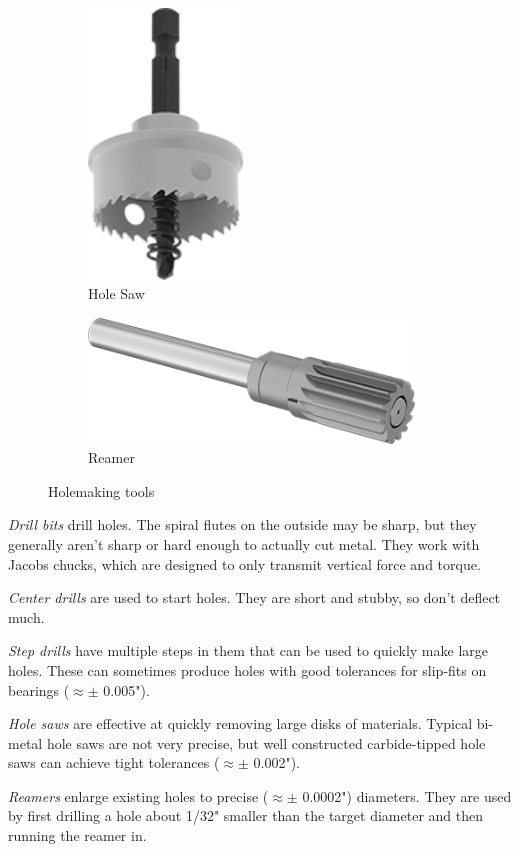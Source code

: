 \begin{figure}[H]
\begin{subfigure}[b]{.19\linewidth}
		\includegraphics[width=0.45\textwidth,angle=73]{imgs/hole_saw.png}
		\caption{Hole Saw}
	\end{subfigure}\begin{subfigure}[b]{.19\linewidth}
		\includegraphics[width=0.95\textwidth]{imgs/reamer.png}
		\caption{Reamer}
	\end{subfigure}
	\caption{Holemaking tools}
\end{figure}

 \begin{asparaenum}[a)]
 	\item \textit{Drill bits} drill holes. The spiral flutes on the outside may be sharp, but they generally aren't sharp or hard enough to actually cut metal. They work with Jacobs chucks, which are designed to only transmit vertical force and torque.
 	\item \textit{Center drills} are used to start holes. They are short and stubby, so don't deflect much.
 	\item \textit{Step drills} have multiple steps in them that can be used to quickly make large holes. These can sometimes produce holes with good tolerances for slip-fits on bearings ($\approx \pm$ 0.005").
 	\item \textit{Hole saws} are effective at quickly removing large disks of materials. Typical bi-metal hole saws are not very precise, but well constructed carbide-tipped hole saws can achieve tight tolerances ($\approx \pm$ 0.002").
 	\item \textit{Reamers} enlarge existing holes to precise ($\approx \pm$ 0.0002") diameters. They are used by first drilling a hole about 1/32" smaller than the target diameter and then running the reamer in.
 \end{asparaenum}

